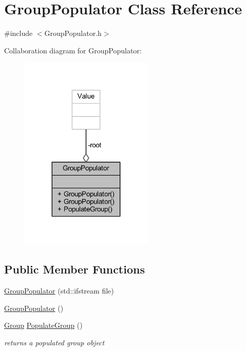 \hypertarget{class_group_populator}{}\section{Group\+Populator Class Reference}
\label{class_group_populator}


{\ttfamily \#include $<$Group\+Populator.\+h$>$}



Collaboration diagram for Group\+Populator\+:\nopagebreak
\begin{figure}[H]
\begin{center}
\leavevmode
\includegraphics[width=179pt]{class_group_populator__coll__graph}
\end{center}
\end{figure}
\subsection*{Public Member Functions}
\begin{DoxyCompactItemize}
\item 
\hyperlink{class_group_populator_a90814524b9b87b4841bdc64f3c7e56ef}{Group\+Populator} (std\+::ifstream file)
\item 
\hyperlink{class_group_populator_a8d125db2718e9d7bb70699094045f43b}{Group\+Populator} ()
\item 
\hyperlink{class_group}{Group} \hyperlink{class_group_populator_ae4c9f15b1d55f61497c97140df8af0b7}{Populate\+Group} ()
\begin{DoxyCompactList}\small\item\em returns a populated group object \end{DoxyCompactList}\end{DoxyCompactItemize}
